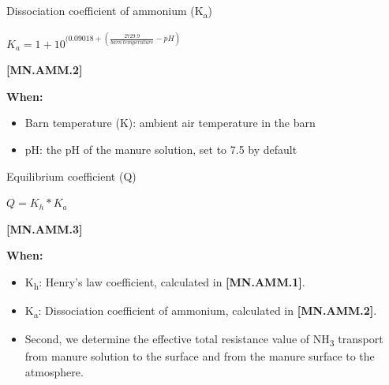 \begin{refsection}
         Dissociation coefficient of ammonium (K\textsubscript{a})
         \vspace{0.2cm}

    \begin{center}
\(K_a  = 1 + 10 ^{(0.09018 + (\frac{2729.9} {barn\ temperature} - pH )}\)
    \end{center}
        \vspace{0.5cm} 
    
            {\raggedleft \textbf{[MN.AMM.2]}\par}
            \vspace{0.5cm}

\textbf{When:}
    \begin{itemize}
        \item Barn temperature (K): ambient air temperature in the barn
        \item pH: the pH of the manure solution, set to 7.5 by default

    \end{itemize}

        
        Equilibrium coefficient (Q)
         \vspace{0.2cm}

    \begin{center}
\(Q = K_h * K_a \)
    \end{center}
        \vspace{0.5cm} 
    
            {\raggedleft \textbf{[MN.AMM.3]}\par}
            \vspace{0.5cm}

\textbf{When:}
    \begin{itemize}
        \item K\textsubscript{h}: Henry’s law coefficient, calculated in \textbf{[MN.AMM.1]}.
        \item K\textsubscript{a}: Dissociation coefficient of ammonium, calculated in \textbf{[MN.AMM.2]}.
    \end{itemize}
    \vspace{0.5cm}
    
    \begin{itemize}
        \item Second, we determine the effective total resistance value of NH\textsubscript{3} transport from manure solution to the surface and from the manure surface to the atmosphere. 
         \vspace{0.2cm}


\end{itemize}
\end{refsection}
